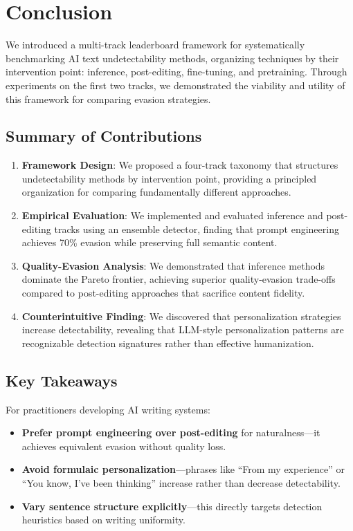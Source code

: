 \section{Conclusion}
\label{sec:conclusion}

We introduced a multi-track leaderboard framework for systematically benchmarking AI text undetectability methods, organizing techniques by their intervention point: inference, post-editing, fine-tuning, and pretraining. Through experiments on the first two tracks, we demonstrated the viability and utility of this framework for comparing evasion strategies.

\subsection{Summary of Contributions}

\begin{enumerate}
    \item \textbf{Framework Design}: We proposed a four-track taxonomy that structures undetectability methods by intervention point, providing a principled organization for comparing fundamentally different approaches.

    \item \textbf{Empirical Evaluation}: We implemented and evaluated inference and post-editing tracks using an ensemble detector, finding that prompt engineering achieves 70\% evasion while preserving full semantic content.

    \item \textbf{Quality-Evasion Analysis}: We demonstrated that inference methods dominate the Pareto frontier, achieving superior quality-evasion trade-offs compared to post-editing approaches that sacrifice content fidelity.

    \item \textbf{Counterintuitive Finding}: We discovered that personalization strategies increase detectability, revealing that LLM-style personalization patterns are recognizable detection signatures rather than effective humanization.
\end{enumerate}

\subsection{Key Takeaways}

For practitioners developing AI writing systems:
\begin{itemize}
    \item \textbf{Prefer prompt engineering over post-editing} for naturalness---it achieves equivalent evasion without quality loss.
    \item \textbf{Avoid formulaic personalization}---phrases like ``From my experience'' or ``You know, I've been thinking'' increase rather than decrease detectability.
    \item \textbf{Vary sentence structure explicitly}---this directly targets detection heuristics based on writing uniformity.
\end{itemize}

